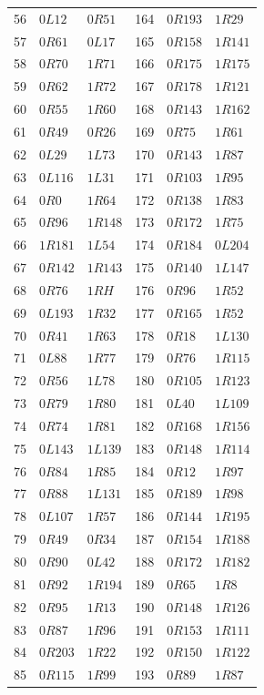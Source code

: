 \begin{longtable}{rll@{\qquad}rll}
56 & $0L12$ & $0R51$ & 164 & $0R193$ & $1R29$\\
57 & $0R61$ & $0L17$ & 165 & $0R158$ & $1R141$\\
58 & $0R70$ & $1R71$ & 166 & $0R175$ & $1R175$\\
59 & $0R62$ & $1R72$ & 167 & $0R178$ & $1R121$\\
60 & $0R55$ & $1R60$ & 168 & $0R143$ & $1R162$\\
61 & $0R49$ & $0R26$ & 169 & $0R75$ & $1R61$\\
62 & $0L29$ & $1L73$ & 170 & $0R143$ & $1R87$\\
63 & $0L116$ & $1L31$ & 171 & $0R103$ & $1R95$\\
64 & $0R0$ & $1R64$ & 172 & $0R138$ & $1R83$\\
65 & $0R96$ & $1R148$ & 173 & $0R172$ & $1R75$\\
66 & $1R181$ & $1L54$ & 174 & $0R184$ & $0L204$\\
67 & $0R142$ & $1R143$ & 175 & $0R140$ & $1L147$\\
68 & $0R76$ & $1RH$ & 176 & $0R96$ & $1R52$\\
69 & $0L193$ & $1R32$ & 177 & $0R165$ & $1R52$\\
70 & $0R41$ & $1R63$ & 178 & $0R18$ & $1L130$\\
71 & $0L88$ & $1R77$ & 179 & $0R76$ & $1R115$\\
72 & $0R56$ & $1L78$ & 180 & $0R105$ & $1R123$\\
73 & $0R79$ & $1R80$ & 181 & $0L40$ & $1L109$\\
74 & $0R74$ & $1R81$ & 182 & $0R168$ & $1R156$\\
75 & $0L143$ & $1L139$ & 183 & $0R148$ & $1R114$\\
76 & $0R84$ & $1R85$ & 184 & $0R12$ & $1R97$\\
77 & $0R88$ & $1L131$ & 185 & $0R189$ & $1R98$\\
78 & $0L107$ & $1R57$ & 186 & $0R144$ & $1R195$\\
79 & $0R49$ & $0R34$ & 187 & $0R154$ & $1R188$\\
80 & $0R90$ & $0L42$ & 188 & $0R172$ & $1R182$\\
81 & $0R92$ & $1R194$ & 189 & $0R65$ & $1R8$\\
82 & $0R95$ & $1R13$ & 190 & $0R148$ & $1R126$\\
83 & $0R87$ & $1R96$ & 191 & $0R153$ & $1R111$\\
84 & $0R203$ & $1R22$ & 192 & $0R150$ & $1R122$\\
85 & $0R115$ & $1R99$ & 193 & $0R89$ & $1R87$\\

\end{longtable}

